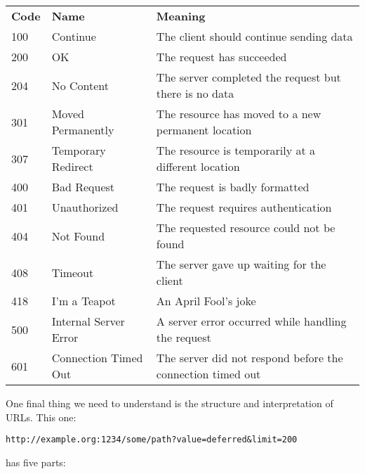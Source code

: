 \begin{table}
\begin{tabular}{llp{}}
\textbf{Code} & \textbf{Name}                  & \textbf{Meaning} \\
100  & Continue              & The client should continue sending data \\
200  & OK                    & The request has succeeded \\
204  & No Content            & The server completed the request but there is no data \\
301  & Moved Permanently     & The resource has moved to a new permanent location \\
307  & Temporary Redirect    & The resource is temporarily at a different location \\
400  & Bad Request           & The request is badly formatted \\
401  & Unauthorized          & The request requires authentication \\
404  & Not Found             & The requested resource could not be found \\
408  & Timeout               & The server gave up waiting for the client \\
418  & I'm a Teapot          & An April Fool's joke \\
500  & Internal Server Error & A server error occurred while handling the request \\
601  & Connection Timed Out  & The server did not respond before the connection timed out
\end{tabular}
\end{table}

One final thing we need to understand is the structure and interpretation of URLs.
This one:

\begin{verbatim}
http://example.org:1234/some/path?value=deferred&limit=200
\end{verbatim}

\noindent
has five parts:

